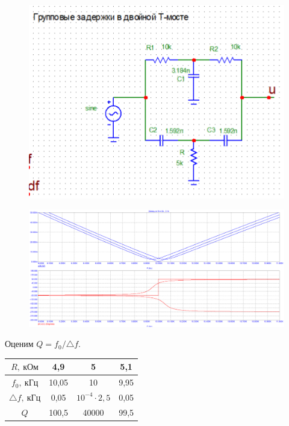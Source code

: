 \documentclass[a4paper, 12pt]{article}%
\begin{document}
\begin{enumerate}
\begin{figure}[h!]
\centering
\includegraphics[scale=0.4]{2tdelay_img.png}
\label{fig:Image1}
\end{figure}

\begin{figure}[h!]
\centering
\includegraphics[scale=0.4]{2tdelay_AC1.png}
\label{fig:Image1}
\end{figure}

Оценим $Q = f_0/\triangle f$.

\begin{center}
\begin{tabular}{|c|c|c|c|}
\hline 
$R, \: \textit{кОм}$ & 4,9 & 5 & 5,1 \\ 
\hline 
$f_0, \: \textit{кГц}$ & 10,05 & 10 & 9,95 \\ 
\hline 
$\triangle f, \: \textit{кГц}$ & 0,05 & $10^{-4}\cdot 2,5$ & 0,05 \\ 
\hline 
$Q$ & 100,5 & 40000 & 99,5 \\ 
\hline 
\end{tabular}
\end{center}


\end{enumerate}
\end{document}

